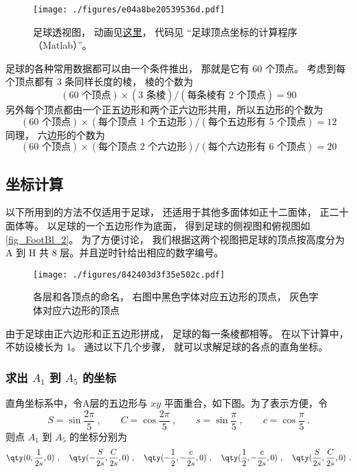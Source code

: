 


\begin{figure}[ht]
\centering
\texttt{[image: ./figures/e04a8be20539536d.pdf]}
\caption{足球透视图， 动画见\href{https://wuli.wiki/apps/football.html}{这里}， 代码见 “足球顶点坐标的计算程序（Matlab）”。} \label{fig_FootBl_1}
\end{figure}

足球的各种常用数据都可以由一个条件推出， 那就是它有 60 个顶点。 考虑到每个顶点都有 3 条同样长度的棱， 棱的个数为
\begin{equation}
(\text{60 个顶点}) \times (\text{3 条棱}) / (\text{每条棱有 2 个顶点}) = 90
\end{equation}
另外每个顶点都由一个正五边形和两个正六边形共用，所以五边形的个数为
\begin{equation}
(\text{60 个顶点}) \times (\text{每个顶点 1 个五边形}) / (\text{每个五边形有 5 个顶点}) = 12
\end{equation}
同理， 六边形的个数为
\begin{equation}
(\text{60 个顶点}) \times (\text{每个顶点 2 个六边形}) / (\text{每个六边形有 6 个顶点}) = 20
\end{equation}


\subsection{坐标计算}
以下所用到的方法不仅适用于足球， 还适用于其他多面体如正十二面体， 正二十面体等。 以足球的一个五边形作为底面， 得到足球的侧视图和俯视图如\autoref{fig_FootBl_2}。 为了方便讨论， 我们根据这两个视图把足球的顶点按高度分为 A 到 H 共 8 层。并且逆时针给出相应的数字编号。

\begin{figure}[ht]
\centering
\texttt{[image: ./figures/842403d3f35e502c.pdf]}
\caption{各层和各顶点的命名， 右图中黑色字体对应五边形的顶点， 灰色字体对应六边形的顶点} \label{fig_FootBl_2}
\end{figure}

由于足球由正六边形和正五边形拼成， 足球的每一条棱都相等。 在以下计算中， 不妨设棱长为 1。 通过以下几个步骤， 就可以求解足球的各点的直角坐标。

\subsubsection{求出 $A_1$ 到 $A_5$ 的坐标}
直角坐标系中，令A层的五边形与 $xy$ 平面重合，如下图。为了表示方便，令
\begin{equation}
S = \sin\frac{2\pi}{5}~, \qquad
C = \cos\frac{2\pi}{5} ~,\qquad
s = \sin\frac{\pi}{5} ~,\qquad
c = \cos\frac{\pi}{5}~.
\end{equation}
则点 $A_1$ 到 $A_5$ 的坐标分别为
\begin{equation}\label{eq_FootBl_5}
\qty(0, \frac{1}{2s}, 0) ~,\quad
\qty(-\frac{S}{2s}, \frac{C}{2s}, 0) ~,\quad
\qty(-\frac12, -\frac{c}{2s}, 0)~, \quad
\qty(\frac12, -\frac{c}{2s}, 0) ~,\quad
\qty(\frac{S}{2s}, \frac{C}{2s}, 0)~.
\end{equation}

